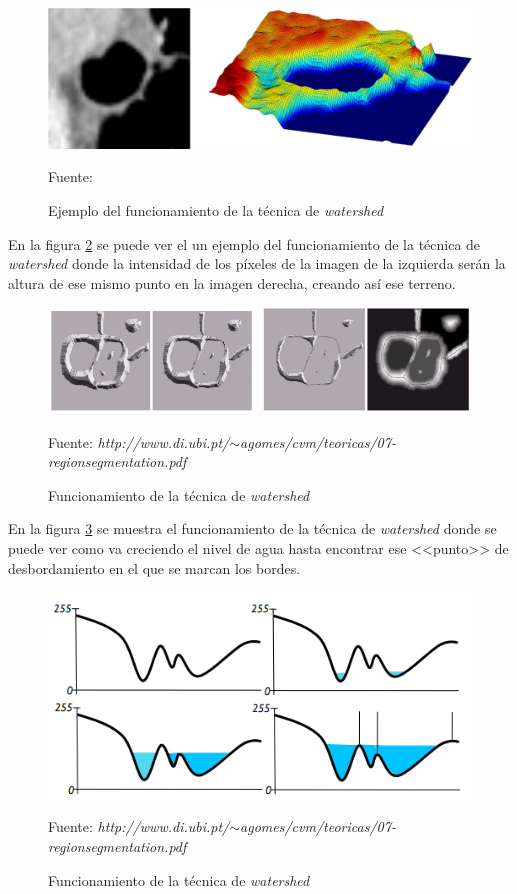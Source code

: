 \begin{figure}[H]
	\captionsetup{justification=centering}
	\centering
	\includegraphics[width=.7\textwidth]{./imagenes/watershed1}
	\caption{Ejemplo del funcionamiento de la t\'{e}cnica de \textit{watershed}}
	\vspace{2 mm}
	Fuente: \cite{eri2015}
	\label{watershed1}
\end{figure}
En la figura \ref{watershed2} se puede ver el un ejemplo del funcionamiento de la t\'{e}cnica de \textit{watershed} donde la intensidad de los p\'{i}xeles de la imagen de la izquierda ser\'{a}n la altura de ese mismo punto en la imagen derecha, creando as\'{i} ese terreno.

\begin{figure}[H]
	\captionsetup{justification=centering}
	\centering
	\includegraphics[width=.8\textwidth]{./imagenes/watershed2}
	\caption{Funcionamiento de la t\'{e}cnica de \textit{watershed}}
	\vspace{2 mm}	
	Fuente: \textit{http://www.di.ubi.pt/$\sim$agomes/cvm/teoricas/07-regionsegmentation.pdf}	
	\label{watershed2}
\end{figure}

En la figura \ref{watershed3} se muestra el funcionamiento de la t\'{e}cnica de \textit{watershed} donde se puede ver como va creciendo el nivel de agua hasta encontrar ese <<punto>> de desbordamiento en el que se marcan los bordes.

\begin{figure}[H]
	\captionsetup{justification=centering}
	\centering
	\includegraphics[width=.6\textwidth]{./imagenes/watershed3}
	\caption{Funcionamiento de la t\'{e}cnica de \textit{watershed}}
	\vspace{2 mm}		
	Fuente: \textit{http://www.di.ubi.pt/$\sim$agomes/cvm/teoricas/07-regionsegmentation.pdf}
	\label{watershed3}
\end{figure}

